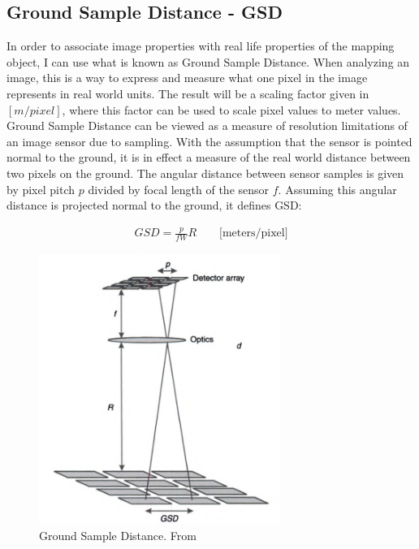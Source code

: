 \subsection{Ground Sample Distance - GSD}
In order to associate image properties with real life properties of the mapping object, I can use what is known as Ground Sample Distance. When analyzing an image, this is a way to express and measure what one pixel in the image represents in real world units. The result will be a scaling factor given in $[m/pixel]$, where this factor can be used to scale pixel values to meter values.\\

Ground Sample Distance can be viewed as a measure of resolution limitations of an image sensor due to sampling\cite{s}. With the assumption that the sensor is pointed normal to the ground, it is in effect a measure of the real world distance between two pixels on the ground. The angular distance between sensor samples is given by pixel pitch $p$ divided by focal length of the sensor $f$. Assuming this angular distance is projected normal to the ground, it defines GSD:

\begin{align}
    GSD = \frac{p}{fW}R \quad\quad\textrm{[meters/pixel]}
    \label{gsd1}
\end{align}

\begin{figure}[H]
  \centering
  \includegraphics[width=0.7\textwidth]{fig/GSDimage}
  \caption{Ground Sample Distance. From \cite{s}}
  \label{fig:gsd}
\end{figure}


